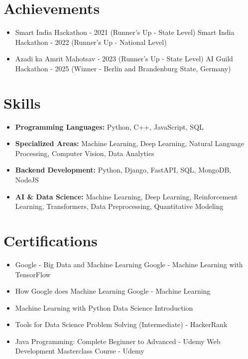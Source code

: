 \documentclass[a4paper,10pt]{article}
\begin{document}
\section*{Achievements}
\begin{itemize}
\item Smart India Hackathon - 2021 (Runner's Up - State Level) \hfill Smart India Hackathon - 2022 (Runner's Up - National Level)
\item Azadi ka Amrit Mahotsav - 2023 (Runner's Up - State Level) \hfill AI Guild Hackathon - 2025 (Winner - Berlin and Brandenburg State, Germany)
\end{itemize}

\section*{Skills}
\begin{itemize}
  \item \textbf{Programming Languages:} Python, C++, JavaScript, SQL
  \item \textbf{Specialized Areas:} Machine Learning, Deep Learning, Natural Language Processing, Computer Vision, Data Analytics
  \item \textbf{Backend Development:} Python, Django, FastAPI, SQL, MongoDB, NodeJS
  \item \textbf{AI \& Data Science:} Machine Learning, Deep Learning, Reinforcement Learning, Transformers, Data Preprocessing, Quantitative Modeling
\end{itemize}

\section*{Certifications}
\begin{itemize}
\item Google - Big Data and Machine Learning \hfill Google - Machine Learning with TensorFlow
\item How Google does Machine Learning \hfill Google - Machine Learning
\item Machine Learning with Python \hfill Data Science Introduction
\item Tools for Data Science \hfill Problem Solving (Intermediate) - HackerRank
\item Java Programming: Complete Beginner to Advanced - Udemy \hfill Web Development Masterclass Course - Udemy
\end{itemize}
\end{document}
